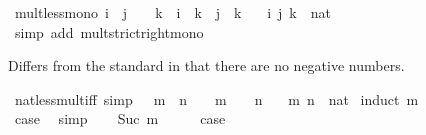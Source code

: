 \begin{isabellebody}
\endisatagproof
{\isafoldproof}%
%
\isadelimproof
\isanewline
%
\endisadelimproof
\isanewline
{}\isamarkupfalse%
\ mult{\isacharunderscore}{\kern0pt}less{\isacharunderscore}{\kern0pt}mono{}{\isacharcolon}{\kern0pt}\ {\isachardoublequoteopen}i\ {\isacharless}{\kern0pt}\ j\ {\isasymLongrightarrow}\ {}\ {\isacharless}{\kern0pt}\ k\ {\isasymLongrightarrow}\ i\ {\isacharasterisk}{\kern0pt}\ k\ {\isacharless}{\kern0pt}\ j\ {\isacharasterisk}{\kern0pt}\ k{\isachardoublequoteclose}\isanewline
\ \ \ i\ j\ k\ {\isacharcolon}{\kern0pt}{\isacharcolon}{\kern0pt}\ nat\isanewline
%
\isadelimproof
\ \ %
\endisadelimproof
%
\isatagproof
{}\isamarkupfalse%
\ {\isacharparenleft}{\kern0pt}simp\ add{\isacharcolon}{\kern0pt}\ mult{\isacharunderscore}{\kern0pt}strict{\isacharunderscore}{\kern0pt}right{\isacharunderscore}{\kern0pt}mono{\isacharparenright}{\kern0pt}%
\endisatagproof
{\isafoldproof}%
%
\isadelimproof
%
\endisadelimproof
%
\begin{isamarkuptext}%
Differs from the standard  in that there are no negative numbers.%
\end{isamarkuptext}\isamarkuptrue%
\isamarkupfalse%
\ nat{\isacharunderscore}{\kern0pt}{}{\isacharunderscore}{\kern0pt}less{\isacharunderscore}{\kern0pt}mult{\isacharunderscore}{\kern0pt}iff\ {\isacharbrackleft}{\kern0pt}simp{\isacharbrackright}{\kern0pt}{\isacharcolon}{\kern0pt}\ {\isachardoublequoteopen}{}\ {\isacharless}{\kern0pt}\ m\ {\isacharasterisk}{\kern0pt}\ n\ {\isasymlongleftrightarrow}\ {}\ {\isacharless}{\kern0pt}\ m\ {\isasymand}\ {}\ {\isacharless}{\kern0pt}\ n{\isachardoublequoteclose}\isanewline
\ \ \ m\ n\ {\isacharcolon}{\kern0pt}{\isacharcolon}{\kern0pt}\ nat\isanewline
%
\isadelimproof
%
\endisadelimproof
%
\isatagproof
{}\isamarkupfalse%
\ {\isacharparenleft}{\kern0pt}induct\ m{\isacharparenright}{\kern0pt}\isanewline
\ \ \isamarkupfalse%
\ {}\isanewline
\ \ \isamarkupfalse%
\ \isamarkupfalse%
\ {\isacharquery}{\kern0pt}case\ \isamarkupfalse%
\ simp\isanewline
{}\isamarkupfalse%
\isanewline
\ \ \isamarkupfalse%
\ {\isacharparenleft}{\kern0pt}Suc\ m{\isacharparenright}{\kern0pt}\isanewline
\ \ \isamarkupfalse%
\ \isamarkupfalse%
\ {\isacharquery}{\kern0pt}case\ \isamarkupfalse%

\end{isabellebody}
